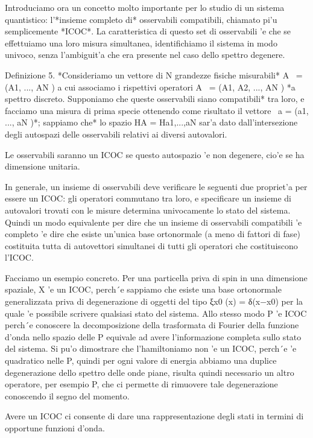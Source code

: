 {	Introduciamo ora un concetto molto importante per lo studio di un sistema quantistico: l'*insieme completo di* osservabili compatibili, chiamato pi'u semplicemente *ICOC*. La caratteristica di questo set di osservabili 'e che se effettuiamo una loro misura simultanea, identifichiamo il sistema in modo univoco, senza l'ambiguit'a che era presente nel caso dello spettro degenere.
	
	Definizione 5. *Consideriamo un vettore di N grandezze fisiche misurabili* A~ = (A1, ..., AN ) a cui associamo i rispettivi operatori A~ = (A1, A2, ..., AN ) *a spettro discreto. Supponiamo che queste osservabili siano compatibili* tra loro, e facciamo una misura di prima specie ottenendo come risultato il vettore ~a = (a1, ..., aN )*; sappiamo che* lo spazio HA = Ha1,...,aN sar'a dato dall'intersezione degli autospazi delle osservabili relativi ai diversi autovalori.
	
	Le osservabili saranno un ICOC se questo autospazio 'e non degenere, cio'e se ha dimensione unitaria.
	
	In generale, un insieme di osservabili deve verificare le seguenti due propriet'a per essere un ICOC: gli operatori commutano tra loro, e specificare un insieme di autovalori trovati con le misure determina univocamente lo stato del sistema. Quindi un modo equivalente per dire che un insieme di osservabili compatibili 'e completo 'e dire che esiste un'unica base ortonormale (a meno di fattori di fase) costituita tutta di autovettori simultanei di tutti gli operatori che costituiscono l'ICOC.
	
	Facciamo un esempio concreto. Per una particella priva di spin in una dimensione spaziale, X 'e un ICOC,
	perch´e sappiamo che esiste una base ortonormale generalizzata priva di degenerazione di oggetti del tipo ξx0
	(x) = δ(x−x0) per la quale 'e possibile scrivere qualsiasi stato del sistema. Allo stesso modo P 'e ICOC perch´e conoscere la decomposizione della trasformata di Fourier della funzione d'onda nello spazio delle P equivale ad avere l'informazione completa sullo stato del sistema. Si pu'o dimostrare che l'hamiltoniamo non 'e un ICOC,
	perch´e 'e quadratico nelle P, quindi per ogni valore di energia abbiamo una duplice degenerazione dello spettro delle onde piane, risulta quindi necessario un altro operatore, per esempio P, che ci permette di rimuovere tale degenerazione conoscendo il segno del momento.
	
	Avere un ICOC ci consente di dare una rappresentazione degli stati in termini di opportune funzioni d'onda.
	
}
